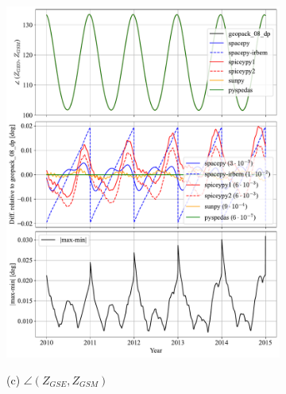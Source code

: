 \documentclass[draft]{agujournal2019}
\begin{document}
\begin{figure}[htb]
\begin{subfigure}[b]{0.49\textwidth}
         \includegraphics[width=\textwidth]{code/figures/angles/delta=1days_20100101-20150101/GEO_GSM.pdf}
     \end{subfigure}
     \par\bigskip\bigskip
     \begin{subfigure}[b]{0.49\textwidth}
         (c) $\angle (Z_{GSE}, Z_{GSM})$
         \centering

\end{subfigure}
\end{figure}
\end{document}

